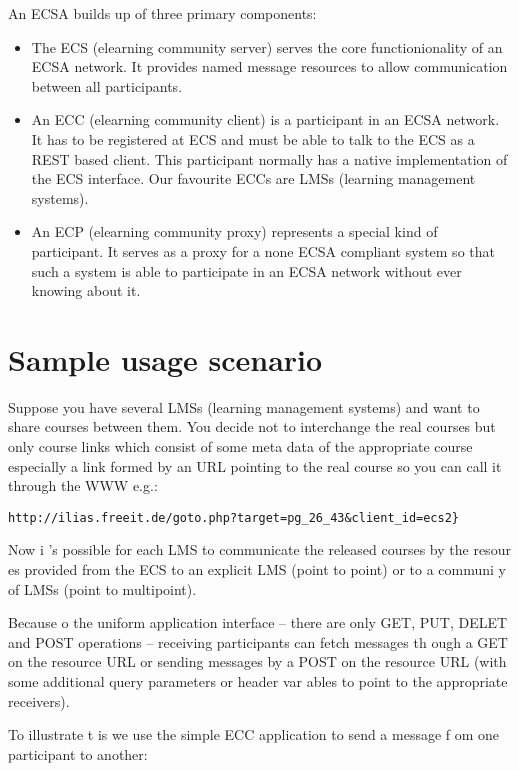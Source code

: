 An ECSA builds up of three primary components:
\begin{itemize}
  \item The ECS (elearning community server) serves the core functionionality of an ECSA network. It provides
  named message resources to allow communication between all participants. 
  \item An ECC (elearning community client)
  is a participant in an ECSA
  network. It has to be registered at ECS and must be able to talk to the ECS
  as a REST based client. This participant normally has a native implementation
  of the ECS interface. Our favourite ECCs are LMSs (learning management
  systems).
  \item An ECP (elearning community proxy)
  represents a special kind of participant. It serves as a proxy for a none
  ECSA compliant system so that such a system is able to participate in an ECSA
  network without ever knowing about it. 
\end{itemize}
 
\section{Sample usage scenario}

Suppose you have several LMSs (learning management systems) and want to share courses between them. You decide not
to interchange the real courses but only course links which consist of some
meta data of the appropriate course especially a link formed by an URL pointing
to the real course so you can call it through the WWW e.g.: 

\verb!http://ilias.freeit.de/goto.php?target=pg_26_43&client_id=ecs2}!

Now i 's possible for each LMS to communicate the released courses by the
resour es provided from the ECS to an explicit LMS (point to point) or to a
communi y of LMSs (point to multipoint). 
         
Because o  the uniform application interface -- there are only GET,
PUT, DELET  and POST operations -- receiving participants can fetch
messages th ough a GET on the resource URL or sending messages
by a POST on the resource URL (with some additional query parameters
or header var ables to point to the appropriate receivers).
               
To illustrate t is we use the simple ECC application  to
send a message f om one participant to another:
                  
